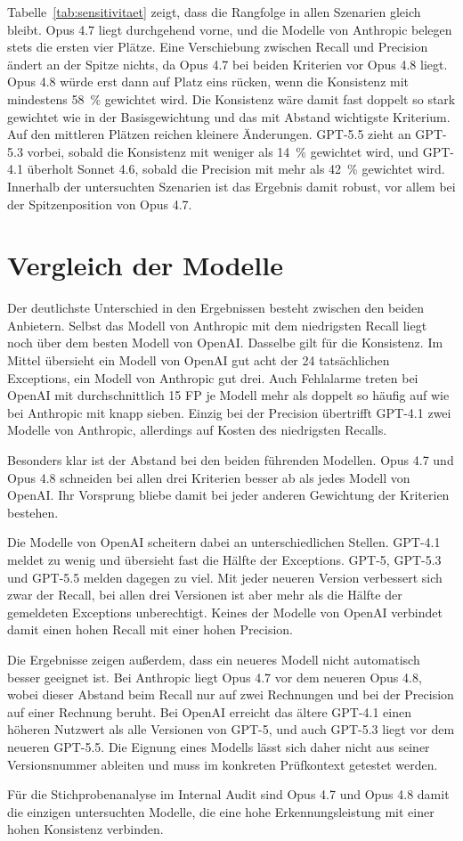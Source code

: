 Tabelle~\ref{tab:sensitivitaet} zeigt, dass die Rangfolge in allen Szenarien gleich bleibt. Opus 4.7 liegt durchgehend vorne, und die Modelle von Anthropic belegen stets die ersten vier Plätze. Eine Verschiebung zwischen Recall und Precision ändert an der Spitze nichts, da Opus 4.7 bei beiden Kriterien vor Opus 4.8 liegt. Opus 4.8 würde erst dann auf Platz eins rücken, wenn die Konsistenz mit mindestens 58~\% gewichtet wird. Die Konsistenz wäre damit fast doppelt so stark gewichtet wie in der Basisgewichtung und das mit Abstand wichtigste Kriterium. Auf den mittleren Plätzen reichen kleinere Änderungen. GPT-5.5 zieht an GPT-5.3 vorbei, sobald die Konsistenz mit weniger als 14~\% gewichtet wird, und GPT-4.1 überholt Sonnet 4.6, sobald die Precision mit mehr als 42~\% gewichtet wird.
Innerhalb der untersuchten Szenarien ist das Ergebnis damit robust, vor allem bei der Spitzenposition von Opus 4.7.

\section{Vergleich der Modelle}
\label{sec:vergleich_modelle}

Der deutlichste Unterschied in den Ergebnissen besteht zwischen den beiden Anbietern. Selbst das Modell von Anthropic mit dem niedrigsten Recall liegt noch über dem besten Modell von OpenAI. Dasselbe gilt für die Konsistenz. Im Mittel übersieht ein Modell von OpenAI gut acht der 24 tatsächlichen Exceptions, ein Modell von Anthropic gut drei. Auch Fehlalarme treten bei OpenAI mit durchschnittlich 15 \ac{FP} je Modell mehr als doppelt so häufig auf wie bei Anthropic mit knapp sieben. Einzig bei der Precision übertrifft GPT-4.1 zwei Modelle von Anthropic, allerdings auf Kosten des niedrigsten Recalls.

Besonders klar ist der Abstand bei den beiden führenden Modellen. Opus 4.7 und Opus 4.8 schneiden bei allen drei Kriterien besser ab als jedes Modell von OpenAI. Ihr Vorsprung bliebe damit bei jeder anderen Gewichtung der Kriterien bestehen.

Die Modelle von OpenAI scheitern dabei an unterschiedlichen Stellen. GPT-4.1 meldet zu wenig und übersieht fast die Hälfte der Exceptions. GPT-5, GPT-5.3 und GPT-5.5 melden dagegen zu viel. Mit jeder neueren Version verbessert sich zwar der Recall, bei allen drei Versionen ist aber mehr als die Hälfte der gemeldeten Exceptions unberechtigt. Keines der Modelle von OpenAI verbindet damit einen hohen Recall mit einer hohen Precision.

Die Ergebnisse zeigen außerdem, dass ein neueres Modell nicht automatisch besser geeignet ist. Bei Anthropic liegt Opus 4.7 vor dem neueren Opus 4.8, wobei dieser Abstand beim Recall nur auf zwei Rechnungen und bei der Precision auf einer Rechnung beruht. Bei OpenAI erreicht das ältere GPT-4.1 einen höheren Nutzwert als alle Versionen von GPT-5, und auch GPT-5.3 liegt vor dem neueren GPT-5.5. Die Eignung eines Modells lässt sich daher nicht aus seiner Versionsnummer ableiten und muss im konkreten Prüfkontext getestet werden.

Für die Stichprobenanalyse im Internal Audit sind Opus 4.7 und Opus 4.8 damit die einzigen untersuchten Modelle, die eine hohe Erkennungsleistung mit einer hohen Konsistenz verbinden.